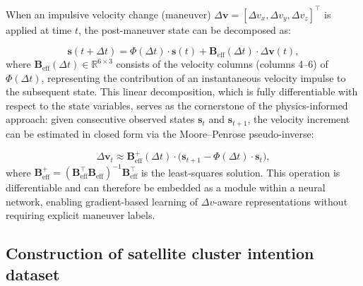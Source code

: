 \documentclass[a4paper,fleqn]{cas-dc}
\newcommand{\biPhi}{\bm{\mathit{\Phi}}} %
\begin{document}
When an impulsive velocity change (maneuver) $\Delta \bm{v} = [\Delta v_x, \Delta v_y, \Delta v_z]^\top$ is applied at time $t$, the post-maneuver state can be decomposed as:

\begin{equation}
    \bm{s}(t + \Delta t) = \biPhi(\Delta t) \cdot \bm{s}(t) + \bm{B}_{\text{eff}}(\Delta t) \cdot \Delta \bm{v}(t), \label{eq:cw_maneuver}
\end{equation}
where $\bm{B}_{\text{eff}}(\Delta t) \in \mathbb{R}^{6 \times 3}$ consists of the velocity columns (columns 4--6) of $\biPhi(\Delta t)$, representing the contribution of an instantaneous velocity impulse to the subsequent state. This linear decomposition, which is fully differentiable with respect to the state variables, serves as the cornerstone of the physics-informed approach: given consecutive observed states $\bm{s}_t$ and $\bm{s}_{t+1}$, the velocity increment can be estimated in closed form via the Moore--Penrose pseudo-inverse:

\begin{equation}
    \Delta \bm{v}_t \approx \bm{B}_{\text{eff}}^+(\Delta t) \cdot \bigl(\bm{s}_{t+1} - \biPhi(\Delta t) \cdot \bm{s}_t\bigr), \label{eq:dv_estimate}
\end{equation}
where $\bm{B}_{\text{eff}}^+ = (\bm{B}_{\text{eff}}^\top \bm{B}_{\text{eff}})^{-1} \bm{B}_{\text{eff}}^\top$ is the least-squares solution. This operation is differentiable and can therefore be embedded as a module within a neural network, enabling gradient-based learning of $\Delta v$-aware representations without requiring explicit maneuver labels.

\subsection{Construction of satellite cluster intention dataset}
\end{document}
